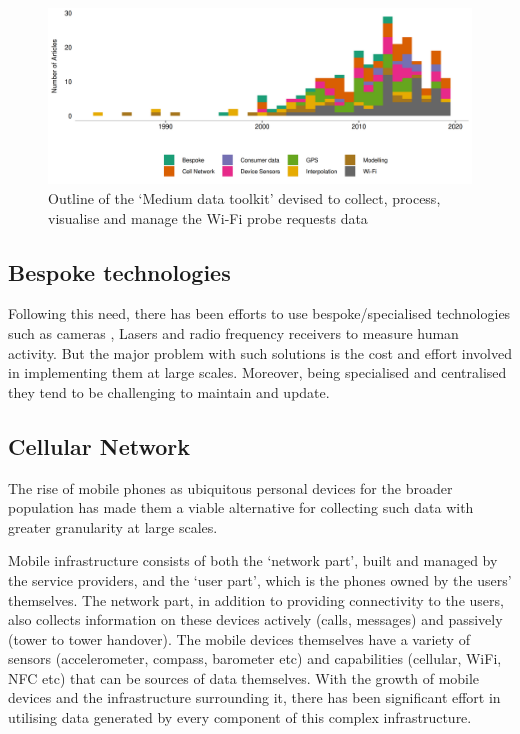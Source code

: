 \begin{figure}
  \includegraphics{images/literature-tech-timeline.png}
  \caption{Outline of the `Medium data toolkit' devised to collect, process, visualise and manage the Wi-Fi probe requests data}
  \label{figure:literature:tech:timeline}
\end{figure}

\subsection{Bespoke technologies}

Following this need, there has been efforts to use bespoke/specialised technologies such as cameras \citep{cai1996, heikkila2004, krockel2012}, Lasers \citep{zhao2005, arras2008} and radio frequency receivers  \citep{bahl2000, yang2013, chothia2010, bulusu2000, dil2011} to measure human activity.
But the major problem with such solutions is the cost and effort involved in implementing them at large scales.
Moreover, being specialised and centralised they tend to be challenging to maintain and update.

\subsection{Cellular Network}

The rise of mobile phones as ubiquitous personal devices for the broader population has made them a viable alternative for collecting such data with greater granularity at large scales.

Mobile infrastructure consists of both the ‘network part’, built and managed by the service providers, and the ‘user part’, which is the phones owned by the users’ themselves.
The network part, in addition to providing connectivity to the users, also collects information on these devices actively (calls, messages) and passively (tower to tower handover).
The mobile devices themselves have a variety of sensors (accelerometer, compass, barometer etc) and capabilities (cellular, WiFi, NFC etc) that can be sources of data themselves.
With the growth of mobile devices and the infrastructure surrounding it, there has been significant effort in utilising data generated by every component of this complex infrastructure.

